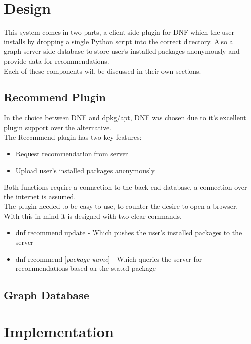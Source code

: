 \documentclass{l4proj}
\begin{document}
 
 
\chapter{Design}
This system comes in two parts, a client side plugin for DNF which the user installs by dropping a single Python script into the correct directory. Also a graph server side database to store user's installed packages anonymously and provide data for recommendations.\\
Each of these components will be discussed in their own sections.

\section{Recommend Plugin}
In the choice between DNF and dpkg/apt, DNF was chosen due to it's excellent plugin support over the alternative.\\
The Recommend plugin has two key features:
\begin{itemize}
\item Request recommendation from server
\item Upload user's installed packages anonymously
\end{itemize}
Both functions require a connection to the back end database, a connection over the internet is assumed.\\
The plugin needed to be easy to use, to counter the desire to open a browser. With this in mind it is designed with two clear commands.
\begin{itemize}
\item dnf recommend update - Which pushes the user's installed packages to the server
\item dnf recommend [\textit{package name}] - Which queries the server for recommendations based on the stated package
\end{itemize}

\section{Graph Database}

 
 
\chapter{Implementation}
 
\end{document}

